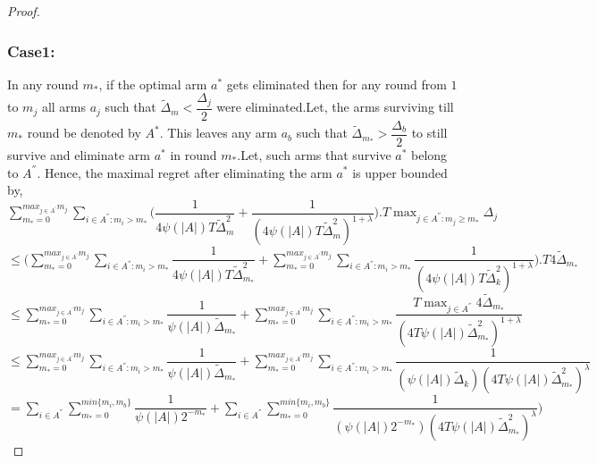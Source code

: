 \begin{proof}
\subsubsection{\textbf{Case1:}}
In any round $m_{*}$, if the optimal arm $a^{*}$ gets eliminated then for any round from $1$ to $m_{j}$ all arms $a_{j}$ such that $\tilde{\Delta}_{m}<\dfrac{\Delta_{j}}{2}$ were eliminated.Let, the arms surviving till $m_{*}$ round be denoted by $A^{*}$. This leaves any arm $a_{b}$ such that $\tilde{\Delta}_{m_{*}}>\dfrac{\Delta_{b}}{2}$ to still survive and eliminate arm $a^{*}$ in round $m_{*}$.Let, such arms that survive $a^{*}$ belong to $A^{''}$. Hence, the maximal regret after eliminating the arm $a^{*}$ is upper bounded by, 
\newline
$\sum_{m_{*}=0}^{max_{j\in A^{'}}m_{j}}\sum_{i\in A^{''}:m_{i}>m_{*}}\bigg(\dfrac{1}{4\psi(|A|)T\tilde{\Delta}_{m}^{2}} + \dfrac{1}{(4\psi(|A|)T\tilde{\Delta}_{m}^{2})^{1+\lambda}}\bigg).T\max_{j\in A^{''}:m_{j}\geq m_{*}}{\Delta}_{j}$
\newline
\hspace*{0em}$\leq\bigg(\sum_{m_{*}=0}^{max_{j\in A^{'}}m_{j}}\sum_{i\in A^{''}:m_{i}>m_{*}}\dfrac{1}{4\psi(|A|)T\tilde{\Delta}_{m_{*}}^{2}} + \sum_{m_{*}=0}^{max_{j\in A^{'}}m_{j}}\sum_{i\in A^{''}:m_{i}>m_{*}}\dfrac{1}{(4\psi(|A|)T\tilde{\Delta}_{k}^{2})^{1+\lambda}}\bigg).T4\tilde{\Delta}_{m_{*}}$
\newline
\hspace*{0em}$\leq\sum_{m_{*}=0}^{max_{j\in A^{'}}m_{j}}\sum_{i\in A^{''}:m_{i}>m_{*}}\dfrac{1}{\psi(|A|)\tilde{\Delta}_{m_{*}}} + \sum_{m_{*}=0}^{max_{j\in A^{'}}m_{j}}\sum_{i\in A^{''}:m_{i}>m_{*}}\dfrac{T\max_{j\in A^{''}}{4\tilde{\Delta}}_{m_{*}}}{(4T\psi(|A|)\tilde{\Delta}_{m_{*}}^{2})^{1+\lambda}}$
\newline
\hspace*{0em}$\leq\sum_{m_{*}=0}^{max_{j\in A^{'}}m_{j}}\sum_{i\in A^{''}:m_{i}>m_{*}}\dfrac{1}{\psi(|A|)\tilde{\Delta}_{m_{*}}} + \sum_{m_{*}=0}^{max_{j\in A^{'}}m_{j}}\sum_{i\in A^{''}:m_{i}>m_{*}}\dfrac{1}{(\psi(|A|)\tilde{\Delta}_{k})(4T\psi(|A|)\tilde{\Delta}_{m_{*}}^{2})^{\lambda}}$
\newline
\hspace*{0em}$=\sum_{i\in A^{''}}\sum_{m_{*}=0}^{min\lbrace m_{i},m_{b}\rbrace}\dfrac{1}{\psi(|A|)2^{-m_{*}}} + \sum_{i\in A^{''}}\sum_{m_{*}=0}^{min\lbrace m_{i},m_{b}\rbrace}\dfrac{1}{(\psi(|A|)2^{-m_{*}})(4T\psi(|A|)\tilde{\Delta}_{m_{*}}^{2})^{\lambda}})$
\newline

\end{proof}
